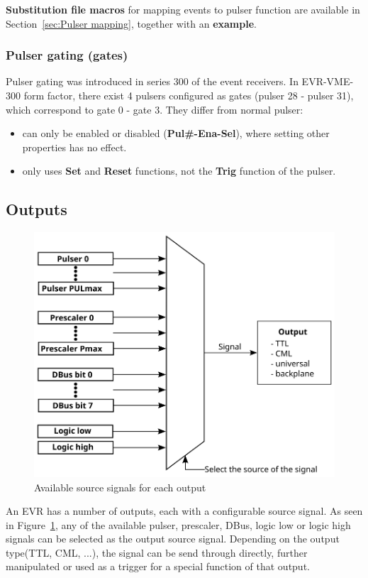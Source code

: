 \documentclass[12pt,a4paper]{article}
\begin{document}
\textbf{Substitution file macros} for mapping events to pulser function are available in Section~\ref{sec:Pulser mapping}, together with an \textbf{example}.

\subsubsection{Pulser gating (gates)}\label{sec:Pulser gate}
Pulser gating was introduced in series 300 of the event receivers. In EVR-VME-300 form factor, there exist 4 pulsers configured as gates (pulser 28 - pulser 31), which correspond to gate 0 - gate 3. They differ from normal pulser:
\begin{itemize}
	\item can only be enabled or disabled (\textbf{Pul\#-Ena-Sel}), where setting other properties has no effect.
	\item only uses \textbf{Set} and \textbf{Reset} functions, not the \textbf{Trig} function of the pulser.
\end{itemize}

\subsection{Outputs}\label{sec:Outputs}
\begin{figure}[H]
	\centering
	\includegraphics[]{./img/output}
	\caption{Available source signals for each output}
	\label{fig:output}
\end{figure}

An EVR has a number of outputs, each with a configurable source signal. As seen in Figure~\ref{fig:output}, any of the available pulser, prescaler, DBus, logic low or logic high signals can be selected as the output source signal. Depending on the output type(TTL, CML, ...), the signal can be send through directly, further manipulated or used as a trigger for a special function of that output.
\end{document}
